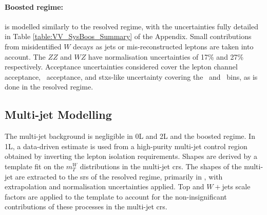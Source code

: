 \paragraph{Boosted regime:} is modelled similarly to the resolved regime, with the uncertainties fully detailed in Table \ref{table:VV_SysBoos_Summary} of the Appendix. Small contributions from misidentified $W$ decays as jets or mis-reconstructed leptons are taken into account. The $ZZ$ and $WZ$ have normalisation uncertainties of 17\% and 27\% respectively. Acceptance uncertainties considered cover the lepton channel acceptance, \ptv\ acceptance, and \gls{stxs}-like uncertainty covering the \ptv\ and \nj\ bins, as is done in the resolved regime.

\subsection{Multi-jet Modelling}\label{sec-modMultiJ} 
The multi-jet background is negligible in 0L and 2L and the boosted regime. In 1L, a data-driven estimate is used from a high-purity multi-jet control region obtained by inverting the lepton isolation requirements. Shapes are derived by a template fit on the $m_T^W$ distributions in the multi-jet \glspl{cr}. The shapes of the multi-jet are extracted to the \glspl{sr} of the resolved regime, primarily in \vhc, with extrapolation and normalisation uncertainties applied. Top and $W+$jets scale factors are applied to the template to account for the non-insignificant contributions of these processes in the multi-jet \glspl{cr}.